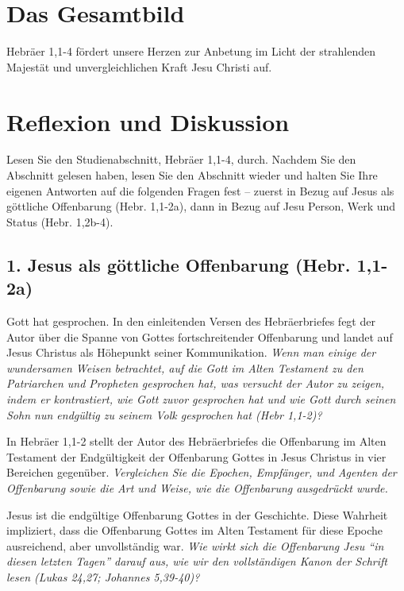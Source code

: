 \documentclass[]{krantz}
\begin{document}
\section{Das Gesamtbild}\label{das-gesamtbild}

Hebräer 1,1-4 fördert unsere Herzen zur Anbetung im Licht der
strahlenden Majestät und unvergleichlichen Kraft Jesu Christi auf.

\section{Reflexion und Diskussion}\label{reflexion-und-diskussion}

Lesen Sie den Studienabschnitt, Hebräer 1,1-4, durch. Nachdem Sie den
Abschnitt gelesen haben, lesen Sie den Abschnitt wieder und halten Sie
Ihre eigenen Antworten auf die folgenden Fragen fest -- zuerst in Bezug
auf Jesus als göttliche Offenbarung (Hebr. 1,1-2a), dann in Bezug auf
Jesu Person, Werk und Status (Hebr. 1,2b-4).

\subsection{1. Jesus als göttliche Offenbarung (Hebr.
1,1-2a)}\label{jesus-als-guxf6ttliche-offenbarung-hebr.-11-2a}

Gott hat gesprochen. In den einleitenden Versen des Hebräerbriefes fegt
der Autor über die Spanne von Gottes fortschreitender Offenbarung und
landet auf Jesus Christus als Höhepunkt seiner Kommunikation. \emph{Wenn
man einige der wundersamen Weisen betrachtet, auf die Gott im Alten
Testament zu den Patriarchen und Propheten gesprochen hat, was versucht
der Autor zu zeigen, indem er kontrastiert, wie Gott zuvor gesprochen
hat und wie Gott durch seinen Sohn nun endgültig zu seinem Volk
gesprochen hat (Hebr 1,1-2)?}

In Hebräer 1,1-2 stellt der Autor des Hebräerbriefes die Offenbarung im
Alten Testament der Endgültigkeit der Offenbarung Gottes in Jesus
Christus in vier Bereichen gegenüber. \emph{Vergleichen Sie die Epochen,
Empfänger, und Agenten der Offenbarung sowie die Art und Weise, wie die
Offenbarung ausgedrückt wurde.}

Jesus ist die endgültige Offenbarung Gottes in der Geschichte. Diese
Wahrheit impliziert, dass die Offenbarung Gottes im Alten Testament für
diese Epoche ausreichend, aber unvollständig war. \emph{Wie wirkt sich
die Offenbarung Jesu ``in diesen letzten Tagen'' darauf aus, wie wir den
vollständigen Kanon der Schrift lesen (Lukas 24,27; Johannes 5,39-40)?}
\end{document}

